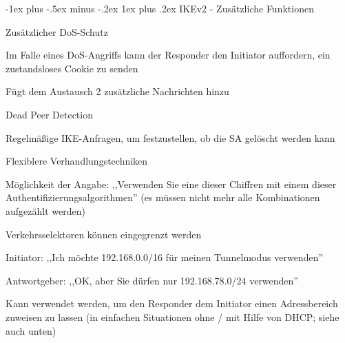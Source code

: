 \documentclass[a4paper]{article}
\makeatletter
\renewcommand{\subsubsection}{\@startsection{subsubsection}{3}{0mm}%
 {-1ex plus -.5ex minus -.2ex}%
 {1ex plus .2ex}%
 {\normalfont\small\bfseries}}
\makeatother
\begin{document}
\begin{multicols}{3}
\begin{itemize*}
            \subsubsection{IKEv2 - Zusätzliche Funktionen}
            \begin{itemize*}
                  \item Zusätzlicher DoS-Schutz
                  \begin{itemize*}
                        \item Im Falle eines DoS-Angriffs kann der Responder den Initiator auffordern, ein zustandsloses Cookie zu senden
                        \item Fügt dem Austausch 2 zusätzliche Nachrichten hinzu
                  \end{itemize*}
                  \item Dead Peer Detection
                  \begin{itemize*}
                        \item Regelmäßige IKE-Anfragen, um festzustellen, ob die SA gelöscht werden kann
                  \end{itemize*}
                  \item Flexiblere Verhandlungstechniken
                  \begin{itemize*}
                        \item Möglichkeit der Angabe: ,,Verwenden Sie eine dieser Chiffren mit einem dieser Authentifizierungsalgorithmen'' (es müssen nicht mehr alle Kombinationen aufgezählt werden)
                        \item Verkehrsselektoren können eingegrenzt werden
                        \begin{itemize*}
                              \item Initiator: ,,Ich möchte 192.168.0.0/16 für meinen Tunnelmodus verwenden''
                              \item Antwortgeber: ,,OK, aber Sie dürfen nur 192.168.78.0/24 verwenden''
                              \item Kann verwendet werden, um den Responder dem Initiator einen Adressbereich zuweisen zu lassen (in einfachen Situationen ohne / mit Hilfe von DHCP; siehe auch unten)
                        \end{itemize*}
                  \end{itemize*}
            \end{itemize*}


\end{itemize*}
\end{multicols}
\end{document}
